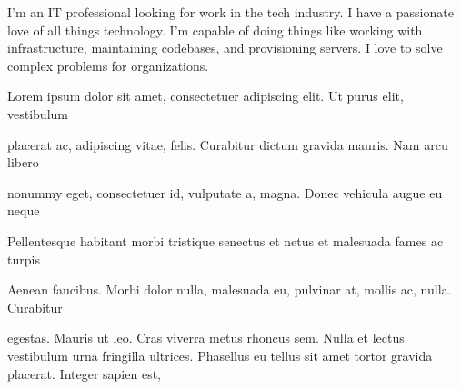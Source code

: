 \documentclass{resume}
\begin{document}
\heading

I'm an IT professional looking for work in the tech industry. I have a passionate love of all things technology. I'm capable of doing things like working with infrastructure, maintaining codebases, and provisioning servers. I love to solve complex problems for organizations.


\begin{qualifications}
    \vspace*{5pt}
    \item Lorem ipsum dolor sit amet, consectetuer adipiscing elit. Ut purus elit, vestibulum
    \item placerat ac, adipiscing vitae, felis. Curabitur dictum gravida mauris. Nam arcu libero
    \item nonummy eget, consectetuer id, vulputate a, magna. Donec vehicula augue eu neque
    \item Pellentesque habitant morbi tristique senectus et netus et malesuada fames ac turpis
    \item Aenean faucibus. Morbi dolor nulla, malesuada eu, pulvinar at, mollis ac, nulla. Curabitur
    \item egestas. Mauris ut leo. Cras viverra metus rhoncus sem. Nulla et lectus vestibulum urna fringilla ultrices. Phasellus eu tellus sit amet tortor gravida placerat. Integer sapien est,
    \vspace*{5pt}
\end{qualifications}

\end{document}
